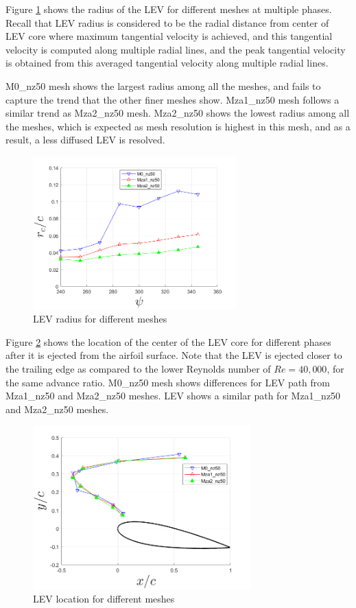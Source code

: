 Figure \ref{fig:zonal_LEV_radius_Re200k} shows the radius of the LEV for different meshes at multiple phases.
Recall that LEV radius is considered to be
the radial distance from center of LEV core where maximum tangential velocity is achieved, and this tangential velocity is computed along multiple radial lines, and the peak tangential
velocity is obtained from this averaged tangential velocity along multiple radial lines.

M0\_nz50 mesh shows the largest radius among all the meshes, and fails to capture the trend that the other finer meshes show.
Mza1\_nz50 mesh follows a similar trend as Mza2\_nz50 mesh.
Mza2\_nz50 shows the lowest radius among all the meshes, which is expected as mesh resolution is highest in this mesh, and as a result, a less diffused LEV is resolved.


\begin{figure}[H]
	\centering
	\includegraphics[width=0.7\textwidth]{figures/zonal_adapt_results/LEV_Re200k/LEV_radius_vp}
	\caption{ LEV radius for different meshes}
	\label{fig:zonal_LEV_radius_Re200k}
\end{figure}

Figure \ref{fig:zonal_LEV_location_Re200k} shows the location of the center of the LEV core for different phases after it is ejected from the airfoil surface.
Note that the LEV is ejected closer to the trailing edge as compared to the lower Reynolds number of $Re=40,000$, for the same advance ratio.
M0\_nz50 mesh shows differences for LEV path from Mza1\_nz50 and Mza2\_nz50 meshes. LEV shows a similar path for Mza1\_nz50 and Mza2\_nz50 meshes.

\begin{figure}[H]
	\centering
	\includegraphics[width=0.75\textwidth]{figures/zonal_adapt_results/LEV_Re200k/LEV_location_Re200k}
	\caption{ LEV location for different meshes}
	\label{fig:zonal_LEV_location_Re200k}
\end{figure}
